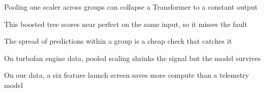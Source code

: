 %
\begin{highlights}
\item Pooling one scaler across groups can collapse a Transformer to a constant output
\item This boosted tree scores near perfect on the same input, so it misses the fault
\item The spread of predictions within a group is a cheap check that catches it
\item On turbofan engine data, pooled scaling shrinks the signal but the model survives
\item On our data, a six feature launch screen saves more compute than a telemetry model
\end{highlights}
